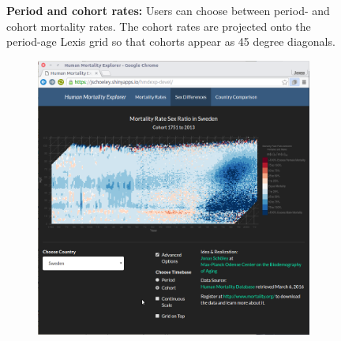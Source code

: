 \documentclass[
  12pt
]{scrartcl}
\begin{document}
\begin{figure}[!htb]
\begin{subfigure}[t]{0.5\textwidth}
    \label{fig:mx_cohort}
    \end{subfigure}%
    \caption*{\textbf{Period and cohort rates:} Users can choose between period- and cohort mortality rates. The cohort rates are projected onto the period-age Lexis grid so that cohorts appear as 45 degree diagonals.}
    \label{fig:mx_pc}
\end{figure}

\begin{figure}[!htb]
  \begin{subfigure}[t]{0.5\textwidth}
    \centering
    \includegraphics[width = \textwidth]{./fig/hmd_screen_disc_col.png}
    \label{fig:mx_disc}
    \end{subfigure}%
  ~
    \begin{subfigure}[t]{0.5\textwidth}

\end{subfigure}
\end{figure}
\end{document}
